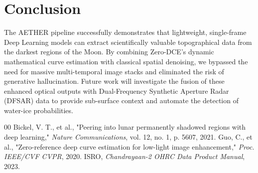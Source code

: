 \documentclass[conference]{IEEEtran}
\begin{document}
\section{Conclusion}
The AETHER pipeline successfully demonstrates that lightweight, single-frame Deep Learning models can extract scientifically valuable topographical data from the darkest regions of the Moon. By combining Zero-DCE's dynamic mathematical curve estimation with classical spatial denoising, we bypassed the need for massive multi-temporal image stacks and eliminated the risk of generative hallucination. Future work will investigate the fusion of these enhanced optical outputs with Dual-Frequency Synthetic Aperture Radar (DFSAR) data to provide sub-surface context and automate the detection of water-ice probabilities.

\begin{thebibliography}{00}
 Bickel, V. T., et al., "Peering into lunar permanently shadowed regions with deep learning," \textit{Nature Communications}, vol. 12, no. 1, p. 5607, 2021.
 Guo, C., et al., "Zero-reference deep curve estimation for low-light image enhancement," \textit{Proc. IEEE/CVF CVPR}, 2020.
 ISRO, \textit{Chandrayaan-2 OHRC Data Product Manual}, 2023.
\end{thebibliography}
\end{document}
